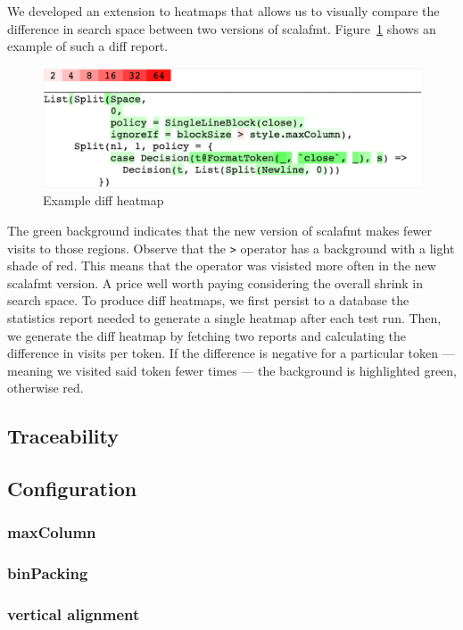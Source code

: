 We developed an extension to heatmaps that allows us to visually compare the difference in search space between two versions of scalafmt.
Figure~\ref{fig:heatmap2} shows an example of such a diff report.
\begin{figure}
  \centering
  \includegraphics[width=\textwidth]{img/heatmap2.png}
  \caption{Example diff heatmap}
  \label{fig:heatmap2}
\end{figure}
The green background indicates that the new version of scalafmt makes fewer visits to those regions.
Observe that the \texttt{>} operator has a background with a light shade of red.
This means that the operator was visisted more often in the new scalafmt version.
A price well worth paying considering the overall shrink in search space.
To produce diff heatmaps, we first persist to a database the statistics report needed to generate a single heatmap after each test run.
Then, we generate the diff heatmap by fetching two reports and calculating the difference in visits per token.
If the difference is negative for a particular token --- meaning we visited said token fewer times --- the background is highlighted green, otherwise red.






\subsection{Traceability}\label{sec:line}
\subsection{Configuration}
\subsubsection{maxColumn}
\subsubsection{binPacking}
\subsubsection{vertical alignment}
